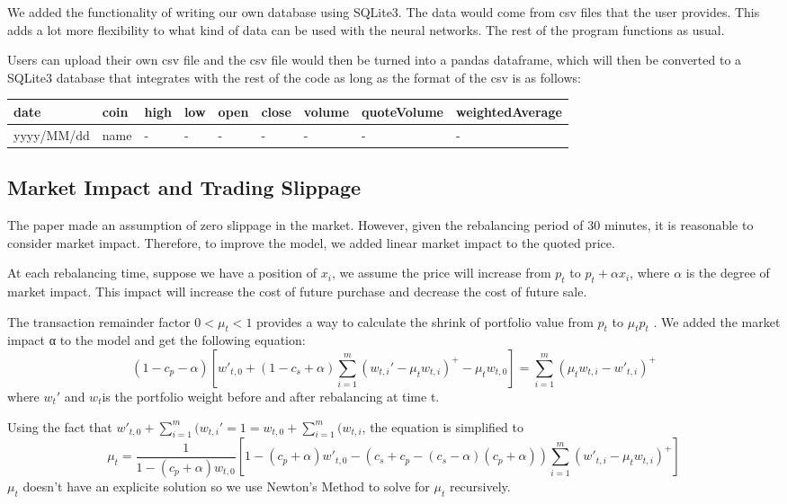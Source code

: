 \documentclass[11pt]{paper}
\begin{document}
		We added the functionality of writing our own database using SQLite3. The data would come from csv files that the user provides. This adds a lot more flexibility to what kind of data can be used with the neural networks. The rest of the program functions as usual.

		Users can upload their own csv file and the csv file would then be turned into a pandas dataframe, which will then be converted to a SQLite3 database that integrates with the rest of the code as long as the format of the csv is as follows:\\

		\begin{tabular}{|l|l|l|l|l|l|l|l|l|}
		\hline
		date       & coin & high & low & open & close & volume & quoteVolume & weightedAverage \\ \hline
		yyyy/MM/dd & name & -    & -   & -    & -     & -      & -           & -               \\ \hline
		\end{tabular}


		\subsection{Market Impact and Trading Slippage}
		The paper made an assumption of zero slippage in the market. However, given the rebalancing period of 30 minutes, it is reasonable to consider market impact. Therefore, to improve the model, we added linear market impact to the quoted price.

		At each rebalancing time, suppose we have a position of $x_i$, we assume the price will increase from $p_t$ to $p_t+\alpha x_i$, where $\alpha$ is the degree of market impact. This impact will increase the cost of future purchase and decrease the cost of future sale.

		The transaction remainder factor $0<\mu_t<1$ provides a way to calculate the shrink of portfolio value from $p_t$ to $\mu_t p_t$ . We added the market impact α to the model and get the following equation:
		\[(1-c_p-\alpha) [w'_{t,0}+(1-c_s+\alpha)\sum_{i=1}^m(w_{t,i}'-\mu_tw_{t,i})^+-\mu_tw_{t,0}]=\sum_{i=1}^m(\mu_tw_{t,i}-w'_{t,i})^+\] where $w_t'$ and $w_t$is the portfolio weight before and after rebalancing at time t.

		Using the fact that $w'_{t,0}+\sum_{i=1}^m(w_{t,i}'=1=w_{t,0}+\sum_{i=1}^m(w_{t,i}$, the equation is simplified to 
		\[\mu_t=\frac{1}{1-(c_p+\alpha)w_{t,0}}[1-(c_p+\alpha)w'_{t,0}-(c_s+c_p-(c_s-\alpha)(c_p+\alpha))\sum_{i=1}^{m}(w'_{t,i}-\mu_tw_{t,i})^+]
		\]
		$\mu_t$ doesn't have an explicite solution so we use Newton's Method to solve for $\mu_t$ recursively.
		
\end{document}
